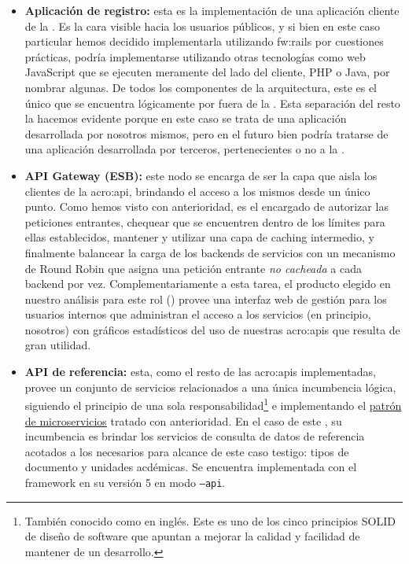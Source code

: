 \begin{itemize}
  \item \textbf{Aplicación de registro:} esta es la implementación de una aplicación cliente de la {\cloud}. Es la cara visible hacia los usuarios públicos, y si bien en este caso particular hemos decidido implementarla utilizando \gls{fw:rails} por cuestiones prácticas, podría implementarse utilizando otras tecnologías como  web JavaScript que se ejecuten meramente del lado del cliente, PHP o Java, por nombrar algunas. De todos los componentes de la arquitectura, este es el único que se encuentra lógicamente por fuera de la {\cloud}. Esta separación del resto la hacemos evidente porque en este caso se trata de una aplicación desarrollada por nosotros mismos, pero en el futuro bien podría tratarse de una aplicación desarrollada por terceros, pertenecientes o no a la {\unlp}.

  \item \textbf{API Gateway (ESB):} este nodo se encarga de ser la capa que aisla los clientes de la \gls{acro:api}, brindando el acceso a los mismos desde un único punto. Como hemos visto con anterioridad, es el encargado de autorizar las peticiones entrantes, chequear que se encuentren dentro de los límites para ellas establecidos, mantener y utilizar una capa de caching intermedio, y finalmente balancear la carga de los backends de servicios con un mecanismo de Round Robin que asigna una petición entrante \textit{no cacheada} a cada backend por vez. Complementariamente a esta tarea, el producto elegido en nuestro análisis para este rol () provee una interfaz web de gestión para los usuarios internos que administran el acceso a los servicios (en principio, nosotros) con gráficos estadísticos del uso de nuestras \glspl{acro:api} que resulta de gran utilidad.

  \item \textbf{API de referencia:} esta, como el resto de las \glspl{acro:api} implementadas, provee un conjunto de servicios relacionados a una única incumbencia lógica, siguiendo el principio de una sola responsabilidad\footnote{También conocido como  en inglés. Este es uno de los cinco principios SOLID de diseño de software que apuntan a mejorar la calidad y facilidad de mantener de un desarrollo.} e implementando el \hyperref[microservicios]{patrón de microservicios} tratado con anterioridad. En el caso de este , su incumbencia es brindar los servicios de consulta de datos de referencia acotados a los necesarios para alcance de este caso testigo: tipos de documento y unidades acdémicas. Se encuentra implementada con el framework  en su versión 5 en modo \texttt{--api}.


\end{itemize}
